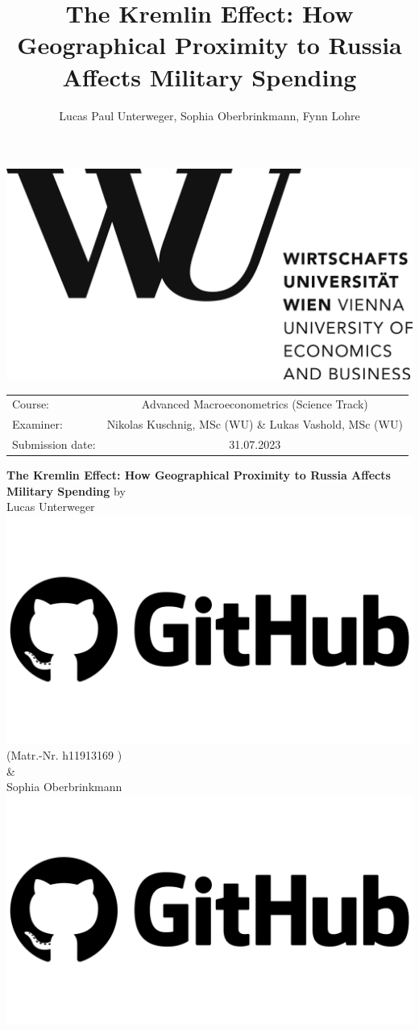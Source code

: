 \documentclass[12pt,a4paper]{article}
\author{Lucas Paul Unterweger, Sophia Oberbrinkmann, Fynn Lohre}
\title{The Kremlin Effect: How Geographical Proximity to Russia Affects Military Spending}
\begin{document}
\begin{titlepage}
\center
\vfill
\includegraphics[scale=0.08]{WU.png}
\vfill
\begin{tabular}[t]{lc}
Course:  & Advanced Macroeconometrics (Science Track) \\
Examiner: & 
Nikolas Kuschnig, MSc (WU) \& Lukas Vashold, MSc (WU) \\
Submission date: & 31.07.2023 \\
\end{tabular}
\vfill
{\large \textbf{The Kremlin Effect: How Geographical Proximity to Russia Affects Military Spending}}
\vfill
by\\ \vspace{3mm}
{\Large Lucas Unterweger \href{https://github.com/therealLucasPaul}{\includegraphics[scale=0.01]{GitHub.png}}}\\
(Matr.-Nr. h11913169 )\\ \vspace{3mm}
\& \\ \vspace{3mm}
{\Large Sophia Oberbrinkmann \href{https://github.com/SophiaOberbrinkmann}{\includegraphics[scale=0.01]{GitHub.png}}}\\

\end{titlepage}
\end{document}
